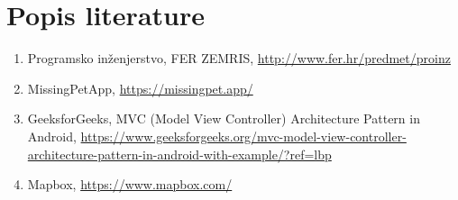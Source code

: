 \chapter*{Popis literature}
	 	
		
		
		\begin{enumerate}
			
			
			\item  Programsko inženjerstvo, FER ZEMRIS, \url{http://www.fer.hr/predmet/proinz}
			
			\item  MissingPetApp, \url{https://missingpet.app/}

			\item  GeeksforGeeks, MVC (Model View Controller) Architecture Pattern in Android, \url{https://www.geeksforgeeks.org/mvc-model-view-controller-architecture-pattern-in-android-with-example/?ref=lbp}

			\item Mapbox, \url{https://www.mapbox.com/}
			
		\end{enumerate}
		
		 